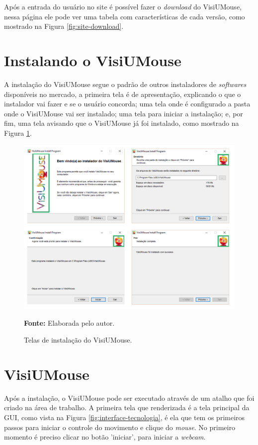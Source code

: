Após a entrada do usuário no site é possível fazer o \textit{download} do VisiUMouse, nessa página ele pode ver uma tabela com características de cada versão, como mostrado na Figura \ref{fig:site-download}.


\section{Instalando o VisiUMouse}
A instalação do VisiUMouse segue o padrão de outros instaladores de \textit{softwares} disponíveis no mercado, a primeira tela é de apresentação, explicando o que o instalador vai fazer e se o usuário concorda; uma tela onde é configurado a pasta onde o VisiUMouse vai ser instalado; uma tela para iniciar a instalação; e, por fim, uma tela avisando que o VisiUMouse já foi instalado, como mostrado na Figura \ref{fig:visiumouse-instalador}.

\begin{figure}[H]
\caption{Telas de instalação do VisiUMouse.} 
\centering \includegraphics[scale=0.45]{img/software-instalador.png}

{\fontsize{11}{11}\selectfont \textbf{Fonte:} Elaborada pelo autor.}
\label{fig:visiumouse-instalador}
\end{figure}

\section{VisiUMouse}
Após a instalação, o VisiUMouse pode ser executado através de um atalho que foi criado na área de trabalho. A primeira tela que renderizada é a tela principal da GUI, como vista na Figura \ref{fig:interface-tecnologia}, é ela que tem os primeiros passos para iniciar o controle do movimento e clique do \textit{mouse}. No primeiro momento é preciso clicar no botão 'iniciar', para iniciar a \textit{webcam}.

